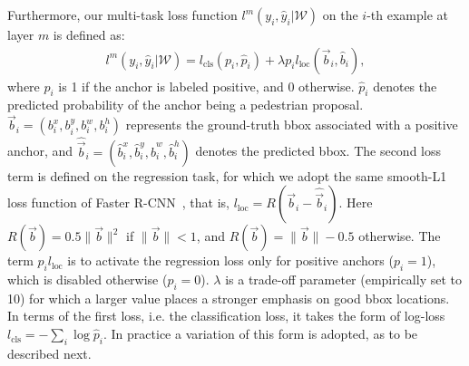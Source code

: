 \documentclass[10pt,journal,compsoc,twoside]{IEEEtran}
\begin{document}
Furthermore, our multi-task loss function $l^m( y_i, \hat{y}_i|\mathcal{W})$ on the $i$-th example at layer $m$ is defined as:
\begin{align}
\label{eq_lm}
l^{m} \left( y_i, \hat{y}_i|\mathcal{W} \right) = l_{\mathrm{cls}} \left( p_i,\hat{p}_i \right) + \lambda p_i l_{\mathrm{loc}} \left(\vec{b}_i,\hat{b}_i \right),
\end{align}
where $p_i$ is 1 if the anchor is labeled positive, and 0 otherwise. $\hat{p}_i$ denotes the predicted probability of the anchor being a pedestrian proposal.
$\vec{b}_i=(b_i^x,b_i^y,b_i^w,b_i^h)$ represents the ground-truth bbox associated with a positive anchor,
and $\hat{\vec{b}}_i=(\hat{b}_i^x,\hat{b}_i^y,\hat{b}_i^w,\hat{b}_i^h)$ denotes the predicted bbox.
The second loss term is defined on the regression task, for which we adopt the same smooth-L1 loss function of Faster R-CNN~\cite{RenEtAl:nips15},
that is, $l_{\mathrm{loc}}=R \left(\vec{b}_i-\hat{\vec{b}}_i \right)$. Here $R(\vec{b})=0.5 \|\vec{b}\|^2$ if $\|\vec{b}\|<1$, and $R(\vec{b})=\|\vec{b}\|-0.5$ otherwise.
The term $p_i l_{\mathrm{loc}}$  is to activate the regression loss only for positive anchors ($p_i=1$), which is disabled otherwise ($p_i=0$).
$\lambda$ is a trade-off parameter (empirically set to 10) for which a larger value places a stronger emphasis on good bbox locations.
In terms of the first loss, i.e. the classification loss, it takes the form of log-loss $l_{\mathrm{cls}}=-\sum_i \log \hat{p}_i$. %
In practice a variation of this form is adopted, as to be described next.
\end{document}
